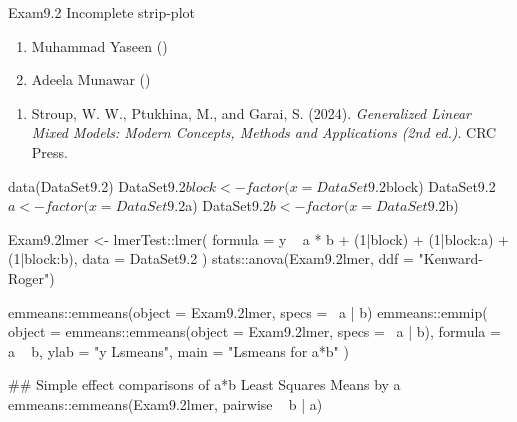 \documentclass[a4paper]{book}
\begin{document}
%
\begin{Description}
Exam9.2 Incomplete strip-plot
\end{Description}
%
\begin{Author}
\begin{enumerate}

\item{}  Muhammad Yaseen ()
\item{} Adeela Munawar ()

\end{enumerate}

\end{Author}
%
\begin{References}
\begin{enumerate}

\item{} Stroup, W. W., Ptukhina, M., and Garai, S. (2024).
\emph{Generalized Linear Mixed Models: Modern Concepts, Methods and Applications (2nd ed.)}.
CRC Press.

\end{enumerate}

\end{References}
%
\begin{SeeAlso}
\end{SeeAlso}
%
\begin{Examples}
\begin{ExampleCode}

data(DataSet9.2)
DataSet9.2$block <- factor(x = DataSet9.2$block)
DataSet9.2$a <- factor(x = DataSet9.2$a)
DataSet9.2$b <- factor(x = DataSet9.2$b)


Exam9.2lmer <- lmerTest::lmer(
  formula = y ~ a * b + (1|block) + (1|block:a) + (1|block:b),
  data    = DataSet9.2
)
stats::anova(Exam9.2lmer, ddf = "Kenward-Roger")

emmeans::emmeans(object = Exam9.2lmer, specs = ~a | b)
emmeans::emmip(
  object  = emmeans::emmeans(object = Exam9.2lmer, specs = ~a | b),
  formula = a ~ b,
  ylab    = "y Lsmeans",
  main    = "Lsmeans for a*b"
)

## Simple effect comparisons of a*b Least Squares Means by a
emmeans::emmeans(Exam9.2lmer, pairwise ~ b | a)


\end{ExampleCode}
\end{Examples}
\end{document}
